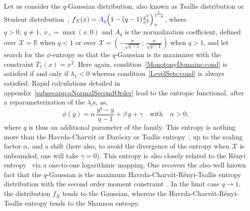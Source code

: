 \documentclass[entropy,article,submit,moreauthors,pdftex]{Definitions/mdpi}
\newcounter{GaussExample}%
\newcounter{qGaussExample}%
\newcommand{\SZ}[1]{{\color{blue} #1}}                                       %
\def\Rset{\mathbb{R}}%
\def\X{\mathcal{X}}%
\begin{document}
\begin{Example}\label{qGauss:ex}\setcounter{qGaussExample}{\value{example}}
   Let  us  consider  the  $q$-Gaussian  distribution,  also  known  as  Tsallis
   distribution   \SZ{or  Student   distribution}~\cite{CosHer03,  JohKot95:v2},
   $f_X(x)    =    \SZ{A_q}    \left(    1    -    (q-1)    \frac{x^2}{\sigma^2}
   \right)_+^{\frac{1}{1-q}}$, where $q > 0, \: q \ne 1, \: x_+ = \max(x,0)$ and
   \SZ{$A_q$} is  the normalization coefficient,  \SZ{defined over $\X  = \Rset$
     when $q  < 1$  or over  $\X =  \left( -  \frac{\sigma}{\sqrt{q-1}} \,  ; \,
     \frac{\sigma}{\sqrt{q-1}} \right) $  when $q > 1$}, and let  search for the
   $\phi$-entropy so that the $q$-Gaussian  is its maximizer with the constraint
   $T_1(x)   =  x^2$.    Here  again,   condition~\ref{MonotonyDomains:cond}  is
   satisfied    if    and    only     if    $\lambda_1    <    0$    \SZ{whereas
     condition~\ref{LevelSets:cond}  is  always satisfied.   Rapid  calculations
     detailed  in   appendix~\ref{subsecapp:qNormalSecondOrder}}  lead   to  the
   entropic  functional,   after  a  reparameterization  of   the  $\lambda_i$s,
   as,  $$\phi(y) =  \alpha \,  \frac{y^q-y}{q-1} +  \beta \,  y +  \gamma \quad
   \mbox{with}  \quad  \alpha >  0,$$  \SZ{  where  $q$  is thus  an  additional
     parameter  of  the  family.   This   entropy}  is  nothing  more  than  the
   Havrda-Charv\'at  or  Dar\'oczy  or  Tsallis  entropy~\cite{HavCha67,  Dar70,
     Tsa88, CosHer03}, up to the scaling  factor $\alpha$, and a shift \SZ{(here
     also, to  avoid the divergence of  the entropy when $\X$  is unbounded, one
     will  take $\gamma  = 0$).   This entropy  is also  closely related  to the
     R\'enyi entropy~\cite{Ren61} via a  one-to-one logarithmic mapping}.  One
   recovers  the also  well  known fact  that the  $q$-Gaussian  is the  maximum
   \SZ{Havrda-Charv\'at-R\'enyi-Tsallis}  entropy distribution  with the  second
   order moment  constraint~\cite{CosHer03}.  In the  limit case $q \to  1$, the
   distribution    $f_X$     tends    to     the    Gaussian,     whereas    the
   Havrda-Charv\'at-R\'enyi-Tsallis entropy tends to the Shannon entropy.
\end{Example}
%
\end{document}
